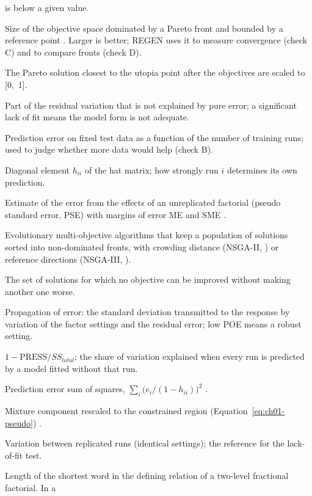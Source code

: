 \begin{description}[style=nextline,leftmargin=2em]
  is below a given value.
\item[Hypervolume] Size of the objective space dominated by a Pareto front and bounded by a reference point
  \citep{zitzler1999}. Larger is better; REGEN uses it to measure convergence (check C) and to compare fronts
  (check D).
\item[Knee point] The Pareto solution closest to the utopia point after the objectives are scaled to [0,~1].
\item[Lack of fit] Part of the residual variation that is not explained by pure error; a significant lack of fit
  means the model form is not adequate.
\item[Learning curve] Prediction error on fixed test data as a function of the number of training runs; used to
  judge whether more data would help (check B).
\item[Leverage] Diagonal element $h_{ii}$ of the hat matrix; how strongly run $i$ determines its own prediction.
\item[Lenth's method] Estimate of the error from the effects of an unreplicated factorial (pseudo standard error,
  PSE) with margins of error ME and SME \citep{lenth1989}.
\item[NSGA-II, NSGA-III] Evolutionary multi-objective algorithms that keep a population of solutions sorted into
  non-dominated fronts, with crowding distance (NSGA-II, \citealp{deb2002}) or reference directions (NSGA-III,
  \citealp{deb2014,das1998}).
\item[Pareto front] The set of solutions for which no objective can be improved without making another one worse.
\item[POE] Propagation of error: the standard deviation transmitted to the response by variation of the factor
  settings and the residual error; low POE means a robust setting.
\item[Predicted $R^2$] $1 - \mathrm{PRESS}/SS_{total}$; the share of variation explained when every run is
  predicted by a model fitted without that run.
\item[PRESS] Prediction error sum of squares, $\sum_i \bigl(e_i/(1-h_{ii})\bigr)^2$ \citep{allen1974}.
\item[Pseudo-component] Mixture component rescaled to the constrained region (Equation~\ref{eq:ch01-pseudo})
  \citep{cornell2002}.
\item[Pure error] Variation between replicated runs (identical settings); the reference for the lack-of-fit test.
\item[Resolution] Length of the shortest word in the defining relation of a two-level fractional factorial. In a

\end{description}
